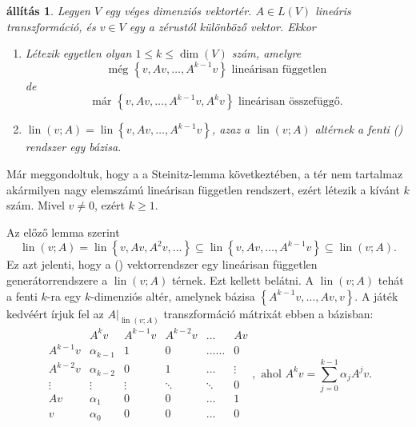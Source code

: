 \documentclass[a4paper, showtrims]{memoir}
\makeatletter
\renewenvironment{proof}[1][\proofname]
    {\par\pushQED{\qed}%
    \normalfont \topsep6\p@\@plus6\p@\relax
    \trivlist
    \item[\hskip\labelsep
        \itshape
    #1\@addpunct{:}]\ignorespaces}
    {\popQED\endtrivlist\@endpefalse}
\theoremstyle{plain}
\newtheorem{proposition}{állítás}[chapter]
\theoremstyle{remark}
\theoremstyle{definition}
\DeclareMathOperator{\lin}{lin}
\makeatother
\begin{document}
\begin{proposition}
	Legyen $V$ egy véges dimenziós vektortér.
	$A\in L\left( V \right)$ lineáris transzformáció,
	és $v\in V$ egy a zérustól különböző vektor.
    Ekkor 
    \begin{enumerate}
        \item 
	    Létezik egyetlen olyan $1\leq k\leq \dim(V)$ szám,
    	amelyre
	    \[
            \text{még }\left\{ v,Av,\ldots,A^{k-1}v \right\} \text{ lineárisan független}\tag{\dag}
	    \]
    	de
	    \[
            \text{már }\left\{ v,Av,\ldots,A^{k-1}v, A^kv \right\} \text{ lineárisan összefüggő.}\tag{\ddag}
    	\]
        \item
            $\lin\left( v;A \right)=
            \lin\left\{ v,Av,\ldots,A^{k-1}v \right\}$, azaz a 
	        $\lin\left( v;A \right)$ altérnek a fenti (\dag) rendszer egy bázisa.
        \qedhere
    \end{enumerate}
\end{proposition}
\begin{proof}
    Már meggondoltuk, hogy a 
    a Steinitz-lemma  következtében,
    a tér nem tartalmaz akármilyen nagy elemszámú lineárisan független rendszert,
    ezért létezik a kívánt $k$ szám. Mivel $v\neq 0$, ezért $k\geq 1$.

	Az előző lemma szerint
	\[
		\lin\left( v;A \right)
		=
		\lin\left\{ v,Av,A^2v,\dots \right\}
		\subseteq
		\lin\left\{ v,Av,\ldots,A^{k-1}v \right\}
		\subseteq
		\lin\left( v;A \right).
	\]
	Ez azt jelenti, hogy a (\dag) vektorrendszer egy lineárisan független generátorrendszere
	a $\lin\left( v;A \right)$ térnek.
    Ezt kellett belátni. 
\end{proof}
A $\lin\left( v;A \right)$ tehát a fenti $k$-ra egy $k$-dimenziós altér,
amelynek bázisa $\left\{A^{k-1}v,\ldots,Av,v \right\}$.
A játék kedvéért írjuk fel az $A|_{\lin\left( v;A \right)}$ transzformáció mátrixát
ebben a bázisban:\label{ar:elsomegjelenes}
\[
	\begin{array}{r|ccccc}
		         & A^kv         & A^{k-1}v & A^{k-2}v & \dots      & Av     \\
		\hline
		A^{k-1}v & \alpha_{k-1} & 1        & 0        & \dots\dots & 0      \\
		A^{k-2}v & \alpha_{k-2} & 0        & 1        & \dots      & \vdots \\
		\vdots   & \vdots       & \vdots   & \ddots   & \ddots     & 0      \\
		Av       & \alpha_1     & 0        & 0        & \dots      & 1      \\
		v        & \alpha_0     & 0        & 0        & \dots      & 0
	\end{array},
	\text{ ahol }A^kv=\sum_{j=0}^{k-1}\alpha_jA^jv.
\]
\end{document}
